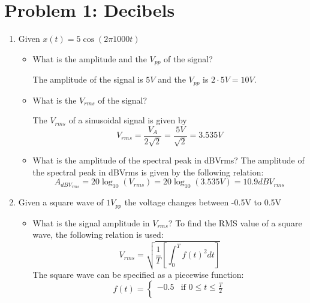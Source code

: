 \section{Problem 1: Decibels}
\begin{enumerate}
    \item Given $x(t) = 5 \cos \left(2\pi 1000t\right)$
          \begin{itemize}
              \item What is the amplitude and the $V_{pp}$ of the signal?

                    The amplitude of the signal is $5V$ and the $V_{pp}$ is $2 \cdot 5V = 10V$.
              \item What is the $V_{rms}$ of the signal?

                    The $V_{rms}$ of a sinusoidal signal is given by
                    \begin{equation}
                        V_{rms} = \frac{V_A}{2\sqrt{2}} = \frac{5V}{\sqrt{2}} = 3.535V
                    \end{equation}
              \item What is the amplitude of the spectral peak in dBVrms?
                    The amplitude of the spectral peak in dBVrms is given by the following relation:
                    \begin{equation}
                        A_{dBV_{rms}} = 20 \log_{10} \left(V_{rms}\right) = 20 \log_{10} \left(3.535V\right) = 10.9dBV_{rms}
                    \end{equation}
          \end{itemize}
    \item Given a square wave of $1V_{pp}$ the voltage changes between -0.5V to 0.5V
          \begin{itemize}
              \item What is the signal amplitude in $V_{rms}$?
                    To find the RMS value of a square wave, the following relation is used:
                    \begin{equation}
                        V_{rms} = \sqrt{\frac{1}{T}\left[\int_{0}^{T}f(t)^2 dt\right]}
                    \end{equation}
                    The square wave can be specified as a piecewise function:
                    \begin{equation}
                        f(t) = \begin{cases}
                            -0.5 & \text{if } 0 \leq t \leq \frac{T}{2} \\

\end{cases}
\end{equation}
\end{itemize}
\end{enumerate}

